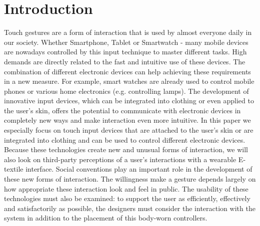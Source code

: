 \documentclass{sigchi}
\begin{document}
\section{Introduction}
%

Touch gestures are a form of interaction that is used by almost everyone daily in our society. Whether Smartphone, Tablet or Smartwatch - many mobile devices are nowadays controlled by this input technique to master different tasks. High demands are directly related to the fast and intuitive use of these devices. The combination of different electronic devices can help achieving these requirements in a new measure. For example, smart watches are already used to control mobile phones or various home electronics (e.g. controlling lamps). The development of innovative input devices, which can be integrated into clothing or even applied to the user's skin, offers the potential to communicate with electronic devices in completely new ways and make interaction even more intuitive. In this paper we especially focus on touch input devices that are attached to the user's skin or are integrated into clothing and can be used to control different electronic devices.
Because these technologies create new and unusual forms of interaction, we will also look on third-party perceptions of a user’s interactions with a wearable E-textile interface. Social conventions play an important role in the development of these new forms of interaction. The willingness make a gesture depends largely on how appropriate these interaction look and feel in public. \cite{touch-wrist} The usability of these technologies must also be examined: to support the user as efficiently, effectively and satisfactorily as possible, the designers must consider the interaction with the system in addition to the placement of this body-worn controllers.

\end{document}
